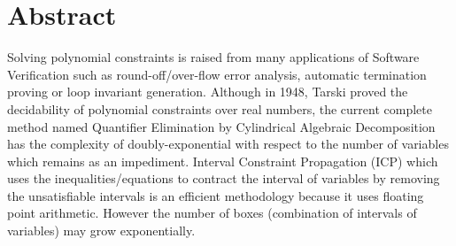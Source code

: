 \chapter*{\centering Abstract} 
Solving polynomial constraints is raised from many applications of Software Verification such as round-off/over-flow error analysis, automatic termination proving or loop invariant generation. Although in 1948, Tarski proved the decidability of polynomial constraints over real numbers, the current complete method named Quantifier Elimination by Cylindrical Algebraic Decomposition has the complexity of doubly-exponential with respect to the number of variables which remains as an impediment. Interval Constraint Propagation (ICP) which uses the inequalities/equations to contract the interval of variables by removing the unsatisfiable intervals is an efficient methodology because it uses floating point arithmetic. However the number of boxes (combination of intervals of variables) may grow exponentially.

